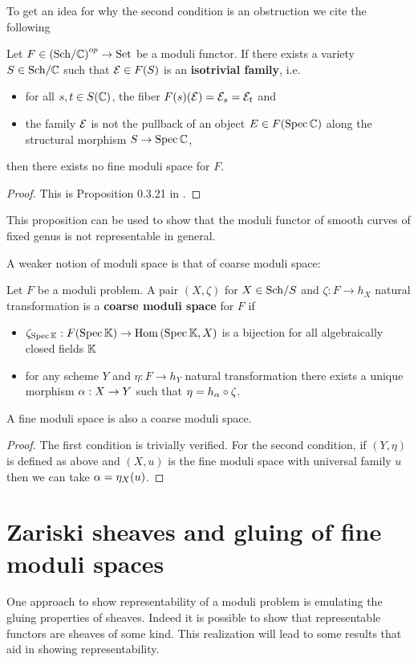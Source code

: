 To get an idea for why the second condition is an obstruction we cite the following
\begin{proposition}
Let $F\in \left({\mathrm{Sch}}/{\mathbb{C}}\right)^{op}\to \mathrm{Set}$ be a moduli functor. If there exists a variety $S\in {\mathrm{Sch}}/{\mathbb{C}}$ such that $\mathcal{E}\in F(S)$ is an \textbf{isotrivial family}, i.e.
\begin{itemize}
\item for all $s,t\in S(\mathbb{C})$, the fiber $F(s)(\mathcal{E})=\mathcal{E}_s=\mathcal{E}_t$ and
\item the family $\mathcal{E}$ is not the pullback of an object $E\in F(\mathrm{Spec}\, \mathbb{C})$ along the structural morphism $S\to \mathrm{Spec}\, \mathbb{C}$,
\end{itemize}
then there exists no fine moduli space for $F$.
\end{proposition}
\begin{proof}
This is Proposition 0.3.21 in \cite{Alper}.
\end{proof}
\begin{remark}
This proposition can be used to show that the moduli functor of smooth curves of fixed genus is not representable in general.
\end{remark}

A weaker notion of moduli space is that of coarse moduli space:
\begin{definition}
Let $F$ be a moduli problem. A pair $(X,\zeta)$ for $X\in {\mathrm{Sch}}/{S}$ and $\zeta:F\to h_X$ natural transformation is a \textbf{coarse moduli space} for $F$ if
\begin{itemize}
\item $\zeta_{\mathrm{Spec}\, \mathbb{K}}:F(\mathrm{Spec}\,\mathbb{K})\to \mathrm{Hom}\,(\mathrm{Spec}\,\mathbb{K},X)$ is a bijection for all algebraically closed fields $\mathbb{K}$
\item for any scheme $Y$ and $\eta:F\to h_{Y}$ natural transformation there exists a unique morphism $\alpha:X\to Y$ such that $\eta=h_\alpha\circ \zeta$.
\end{itemize}
\end{definition}
\begin{proposition}
A fine moduli space is also a coarse moduli space.
\end{proposition}
\begin{proof}
The first condition is trivially verified. For the second condition, if $(Y,\eta)$ is defined as above and $(X,u)$ is the fine moduli space with universal family $u$ then we can take $\alpha=\eta_X(u)$.
\end{proof}


\section{Zariski sheaves and gluing of fine moduli spaces}
One approach to show representability of a moduli problem is emulating the gluing properties of sheaves.
Indeed it is possible to show that representable functors are sheaves of some kind. This realization will lead to some results that aid in showing representability. 

